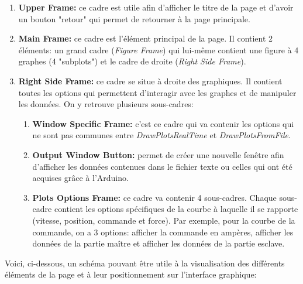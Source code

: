\begin{enumerate}
    \item \textbf{Upper Frame:} ce cadre est utile afin d'afficher le titre de la page et d'avoir un bouton "retour" qui permet de retourner à la page principale.
    \item \textbf{Main Frame:} ce cadre est l'élément principal de la page. Il contient 2 éléments: un grand cadre (\textit{Figure Frame}) qui lui-même contient une figure à 4 graphes (4 "subplots") et le cadre de droite (\textit{Right Side Frame}).
    \item \textbf{Right Side Frame:} ce cadre se situe à droite des graphiques. Il contient toutes les options qui permettent d'interagir avec les graphes et de manipuler les données. On y retrouve plusieurs sous-cadres:
    \begin{enumerate}
        \item \textbf{Window Specific Frame:} c'est ce cadre qui va contenir les options qui ne sont pas communes entre \textit{DrawPlotsRealTime} et \textit{DrawPlotsFromFile}.
        \item \textbf{Output Window Button:} permet de créer une nouvelle fenêtre afin d'afficher les données contenues dans le fichier texte ou celles qui ont été acquises grâce à l'Arduino.
        \item \textbf{Plots Options Frame:} ce cadre va contenir 4 sous-cadres. Chaque sous-cadre contient les options spécifiques de la courbe à laquelle il se rapporte (vitesse, position, commande et force). Par exemple, pour la courbe de la commande, on a 3 options: afficher la commande en ampères, afficher les données de la partie maître et afficher les données de la partie esclave.\\
    \end{enumerate}
\end{enumerate}

Voici, ci-dessous, un schéma pouvant être utile à la visualisation des différents éléments de la page et à leur positionnement sur l'interface graphique:

